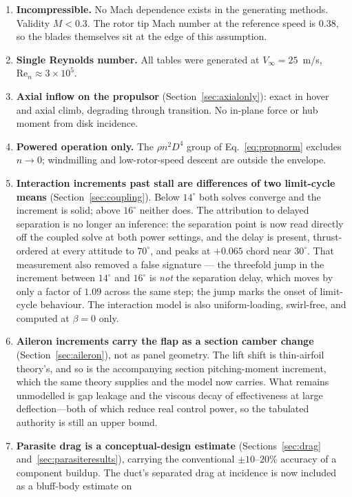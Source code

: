 \documentclass[11pt,a4paper]{article}
\newcommand{\dg}{^\circ}
\begin{document}
\begin{enumerate}
\item \textbf{Incompressible.} No Mach dependence exists in the
generating methods. Validity $M < 0.3$. The rotor tip Mach number at the
reference speed is $0.38$, so the blades themselves sit at the edge of
this assumption.
\item \textbf{Single Reynolds number.} All tables were generated at
$V_\infty = 25$~m/s, $\mathrm{Re}_n \approx 3\times 10^5$.
\item \textbf{Axial inflow on the propulsor}
(Section~\ref{sec:axialonly}): exact in hover and axial climb, degrading
through transition. No in-plane force or hub moment from disk incidence.
\item \textbf{Powered operation only.} The $\rho n^2 D^4$ group of
Eq.~\eqref{eq:propnorm} excludes $n \to 0$; windmilling and
low-rotor-speed descent are outside the envelope.
\item \textbf{Interaction increments past stall are differences of two
limit-cycle means} (Section~\ref{sec:coupling}). Below $14\dg$ both
solves converge and the increment is solid; above $16\dg$ neither does.
The attribution to delayed separation is no longer an inference: the
separation point is now read directly off the coupled solve at both
power settings, and the delay is present, thrust-ordered at every
attitude to $70\dg$, and peaks at $+0.065$ chord near $30\dg$. That
measurement also removed a false signature --- the threefold jump in the
increment between $14\dg$ and $16\dg$ is \emph{not} the separation delay,
which moves by only a factor of $1.09$ across the same step; the jump
marks the onset of limit-cycle behaviour. The interaction model is also
uniform-loading, swirl-free, and computed at $\beta = 0$ only.
\item \textbf{Aileron increments carry the flap as a section camber
change} (Section~\ref{sec:aileron}), not as panel geometry. The lift
shift is thin-airfoil theory's, and so is the accompanying section
pitching-moment increment, which the same theory supplies and the model
now carries. What remains unmodelled is gap leakage and the viscous decay
of effectiveness at large deflection---both of which reduce real control
power, so the tabulated authority is still an upper bound.
\item \textbf{Parasite drag is a conceptual-design estimate}
(Sections~\ref{sec:drag} and~\ref{sec:parasiteresults}), carrying the
conventional $\pm10$--$20\%$ accuracy of a component buildup. The duct's
separated drag at incidence is now included as a bluff-body estimate on

\end{enumerate}
\end{document}
